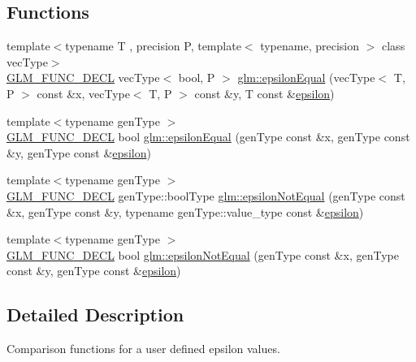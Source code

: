 \subsection*{Functions}
\begin{DoxyCompactItemize}
\item 
{\footnotesize template$<$typename T , precision P, template$<$ typename, precision $>$ class vec\+Type$>$ }\\\hyperlink{setup_8hpp_ab2d052de21a70539923e9bcbf6e83a51}{G\+L\+M\+\_\+\+F\+U\+N\+C\+\_\+\+D\+E\+CL} vec\+Type$<$ bool, P $>$ \hyperlink{group__gtc__epsilon_gaca9443f217dc36587624247245522331}{glm\+::epsilon\+Equal} (vec\+Type$<$ T, P $>$ const \&x, vec\+Type$<$ T, P $>$ const \&y, T const \&\hyperlink{group__gtc__constants_gacb41049b8d22c8aa90e362b96c524feb}{epsilon})
\item 
{\footnotesize template$<$typename gen\+Type $>$ }\\\hyperlink{setup_8hpp_ab2d052de21a70539923e9bcbf6e83a51}{G\+L\+M\+\_\+\+F\+U\+N\+C\+\_\+\+D\+E\+CL} bool \hyperlink{group__gtc__epsilon_gaa7f227999ca09e7ca994e8b35aba47bb}{glm\+::epsilon\+Equal} (gen\+Type const \&x, gen\+Type const \&y, gen\+Type const \&\hyperlink{group__gtc__constants_gacb41049b8d22c8aa90e362b96c524feb}{epsilon})
\item 
{\footnotesize template$<$typename gen\+Type $>$ }\\\hyperlink{setup_8hpp_ab2d052de21a70539923e9bcbf6e83a51}{G\+L\+M\+\_\+\+F\+U\+N\+C\+\_\+\+D\+E\+CL} gen\+Type\+::bool\+Type \hyperlink{group__gtc__epsilon_ga14e2888a304654ade8a3996024e2739c}{glm\+::epsilon\+Not\+Equal} (gen\+Type const \&x, gen\+Type const \&y, typename gen\+Type\+::value\+\_\+type const \&\hyperlink{group__gtc__constants_gacb41049b8d22c8aa90e362b96c524feb}{epsilon})
\item 
{\footnotesize template$<$typename gen\+Type $>$ }\\\hyperlink{setup_8hpp_ab2d052de21a70539923e9bcbf6e83a51}{G\+L\+M\+\_\+\+F\+U\+N\+C\+\_\+\+D\+E\+CL} bool \hyperlink{group__gtc__epsilon_ga50a92103fb0cbd796908e1bf20c79aaf}{glm\+::epsilon\+Not\+Equal} (gen\+Type const \&x, gen\+Type const \&y, gen\+Type const \&\hyperlink{group__gtc__constants_gacb41049b8d22c8aa90e362b96c524feb}{epsilon})
\end{DoxyCompactItemize}


\subsection{Detailed Description}
Comparison functions for a user defined epsilon values. 

